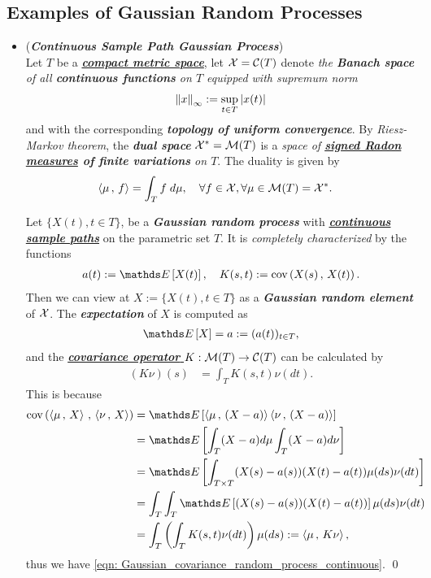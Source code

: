 \documentclass[11pt]{article}
\begin{document}
\subsection{Examples of Gaussian Random Processes}
\begin{itemize}
\item \begin{example} (\emph{\textbf{Continuous Sample Path Gaussian Process}})  \citep{lifshits2012lectures}\\
Let $T$ be a \underline{\emph{\textbf{compact metric space}}}, let ${\mathcal X} = {\mathcal C}(T)$ denote \emph{the \textbf{Banach space} of all \textbf{continuous functions} on
$T$ equipped with supremum norm} 
\begin{align*}
\left\|x\right\|_{\infty} := \sup_{t \in T}\left\lvert x(t) \right\rvert
\end{align*}
and with the corresponding \emph{\textbf{topology of uniform convergence}}. By \emph{Riesz-Markov theorem}, the \emph{\textbf{dual space}} ${\mathcal X}^{*} = {\mathcal M}(T)$ is a \emph{space of \textbf{\underline{signed Radon measures} of finite variations} on $T$}. The duality is given by 
\begin{align*}
\left\langle \mu\,,\, f \right\rangle &= \int_{T} f\;  d\mu, \quad \forall f\in {\mathcal X},  \forall \mu \in  {\mathcal M}(T) = {\mathcal X}^{*}.
\end{align*}

Let $\{X(t), t \in T\}$, be a \emph{\textbf{Gaussian random process}} with \underline{\emph{\textbf{continuous sample paths}}} on the parametric set $T$. It is \emph{completely characterized} by the functions
\begin{align*}
a(t) := \E{}{X(t)}, \quad K(s, t) := \cov{X(s)}{X(t)}.
\end{align*} Then we can view at $X:=\{X(t), t \in T\}$ as a \emph{\textbf{Gaussian random element}} of ${\mathcal X}$. The \emph{\textbf{expectation}} of $X$ is computed as
\begin{align*}
\E{}{X} = a := (a(t))_{t\in T},
\end{align*} and the \underline{\emph{\textbf{covariance operator}} $K:  {\mathcal M}(T) \to {\mathcal C}(T)$} can be calculated by 
\begin{align}
(K\nu)(s) &=  \int_{T} K(s, t) \nu(dt). \label{eqn: Gaussian_covariance_random_process_continuous}
\end{align}
This is because
\begin{align*}
\cov{\inn{\mu}{X}}{\inn{\nu}{X}} &= \E{}{\inn{\mu}{(X-a)} \inn{\nu}{(X-a)}}\\
&= \E{}{ \int_{T} (X -a) d\mu \int_{T} (X-a) d\nu } \\
&= \E{}{\int_{T \times T} (X(s)- a(s))(X(t)-a(t)) \mu(ds)\nu(dt) } \\
&= \int_{T}\int_{T} \E{}{ (X(s)- a(s))(X(t)-a(t)) } \mu(ds)\nu(dt) \\
& = \int_{T} \paren{\int_T K(s, t) \nu(dt)} \mu(ds) := \inn{\mu}{K\nu},
\end{align*} thus we have \eqref{eqn: Gaussian_covariance_random_process_continuous}. \qed


\end{example}
\end{itemize}
\end{document}
